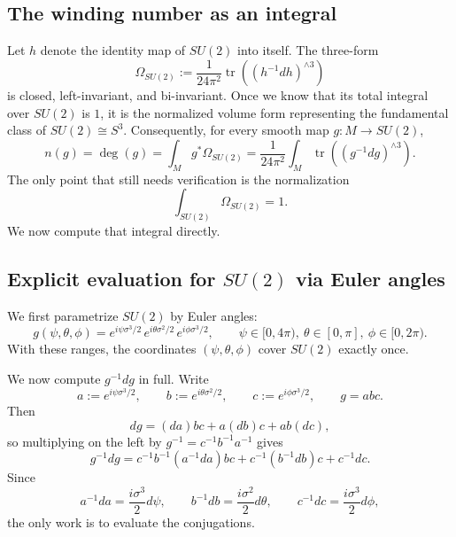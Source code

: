 \documentclass[11pt]{article}
\newcommand{\tr}{\operatorname{tr}}
\theoremstyle{definition}
\numberwithin{theorem}{section}
\numberwithin{equation}{section}
\begin{document}
\subsection{The winding number as an integral}

Let $h$ denote the identity map of $SU(2)$ into itself. The three-form
\begin{equation}\label{eq:su2-volume-form}
\Omega_{SU(2)} := \frac{1}{24\pi^2}\tr\left((h^{-1}dh)^{\wedge 3}\right)
\end{equation}
is closed, left-invariant, and bi-invariant. Once we know that its total integral over $SU(2)$ is $1$, it is the normalized volume form representing the fundamental class of $SU(2)\cong S^3$. Consequently, for every smooth map $g:M\to SU(2)$,
\begin{equation}\label{eq:winding-integral}
n(g) = \deg(g) = \int_M g^*\Omega_{SU(2)} = \frac{1}{24\pi^2}\int_M \tr\left((g^{-1}dg)^{\wedge 3}\right).
\end{equation}
The only point that still needs verification is the normalization
\begin{equation*}
\int_{SU(2)}\Omega_{SU(2)} = 1.
\end{equation*}
We now compute that integral directly.

\subsection{Explicit evaluation for $SU(2)$ via Euler angles}\label{subsec:Euler}

We first parametrize $SU(2)$ by Euler angles:
\begin{equation}\label{eq:Euler}
g(\psi,\theta,\phi) = e^{i\psi \sigma^3/2}\, e^{i\theta \sigma^2/2}\, e^{i\phi \sigma^3/2},
\qquad
\psi\in [0,4\pi),\ \theta\in[0,\pi],\ \phi\in[0,2\pi).
\end{equation}
With these ranges, the coordinates $(\psi,\theta,\phi)$ cover $SU(2)$ exactly once.

\medskip

\noindent We now compute $g^{-1}dg$ in full. Write
\begin{equation*}
a := e^{i\psi\sigma^3/2},
\qquad
b := e^{i\theta\sigma^2/2},
\qquad
c := e^{i\phi\sigma^3/2},
\qquad
g = abc.
\end{equation*}
Then
\begin{equation*}
dg = (da)bc + a(db)c + ab(dc),
\end{equation*}
so multiplying on the left by $g^{-1} = c^{-1}b^{-1}a^{-1}$ gives
\begin{equation}\label{eq:g-inv-dg-split}
g^{-1}dg = c^{-1}b^{-1}(a^{-1}da)bc + c^{-1}(b^{-1}db)c + c^{-1}dc.
\end{equation}
Since
\begin{equation*}
a^{-1}da = \frac{i\sigma^3}{2}d\psi,
\qquad
b^{-1}db = \frac{i\sigma^2}{2}d\theta,
\qquad
c^{-1}dc = \frac{i\sigma^3}{2}d\phi,
\end{equation*}
the only work is to evaluate the conjugations.
\end{document}
